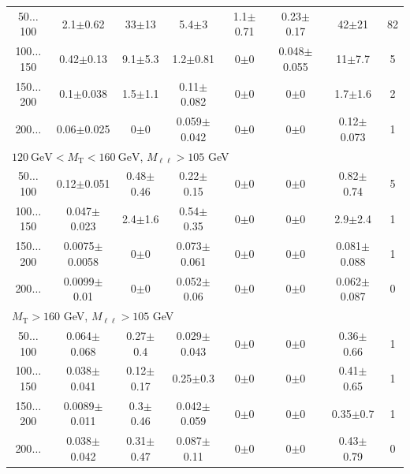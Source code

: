 \begin{table}
\begin{center}
\begin{tabular}{| c | c c c c c c c | }
50$\dots$100&2.1$\pm$0.62&33$\pm$13&5.4$\pm$3&1.1$\pm$0.71&0.23$\pm$0.17&42$\pm$21&82\\
100$\dots$150&0.42$\pm$0.13&9.1$\pm$5.3&1.2$\pm$0.81&0$\pm$0&0.048$\pm$0.055&11$\pm$7.7&5\\
150$\dots$200&0.1$\pm$0.038&1.5$\pm$1.1&0.11$\pm$0.082&0$\pm$0&0$\pm$0&1.7$\pm$1.6&2\\
200$\dots$&0.06$\pm$0.025&0$\pm$0&0.059$\pm$0.042&0$\pm$0&0$\pm$0&0.12$\pm$0.073&1\\
\hline\hline
\multicolumn{8}{l}{$120~\mathrm{GeV} < M_{\text{T}} < 160~\mathrm{GeV}$, $M_{\ell\ell} > 105$ GeV}\\\hline\hline
50$\dots$100&0.12$\pm$0.051&0.48$\pm$0.46&0.22$\pm$0.15&0$\pm$0&0$\pm$0&0.82$\pm$0.74&5\\
100$\dots$150&0.047$\pm$0.023&2.4$\pm$1.6&0.54$\pm$0.35&0$\pm$0&0$\pm$0&2.9$\pm$2.4&1\\
150$\dots$200&0.0075$\pm$0.0058&0$\pm$0&0.073$\pm$0.061&0$\pm$0&0$\pm$0&0.081$\pm$0.088&1\\
200$\dots$&0.0099$\pm$0.01&0$\pm$0&0.052$\pm$0.06&0$\pm$0&0$\pm$0&0.062$\pm$0.087&0\\
\hline\hline
\multicolumn{8}{l}{$M_{\text{T}} > 160$ GeV, $M_{\ell\ell} > 105$ GeV}\\\hline\hline
50$\dots$100&0.064$\pm$0.068&0.27$\pm$0.4&0.029$\pm$0.043&0$\pm$0&0$\pm$0&0.36$\pm$0.66&1\\
100$\dots$150&0.038$\pm$0.041&0.12$\pm$0.17&0.25$\pm$0.3&0$\pm$0&0$\pm$0&0.41$\pm$0.65&1\\
150$\dots$200&0.0089$\pm$0.011&0.3$\pm$0.46&0.042$\pm$0.059&0$\pm$0&0$\pm$0&0.35$\pm$0.7&1\\
200$\dots$&0.038$\pm$0.042&0.31$\pm$0.47&0.087$\pm$0.11&0$\pm$0&0$\pm$0&0.43$\pm$0.79&0\\
\hline\hline
\end{tabular}
\end{center}
\end{table}
\clearpage